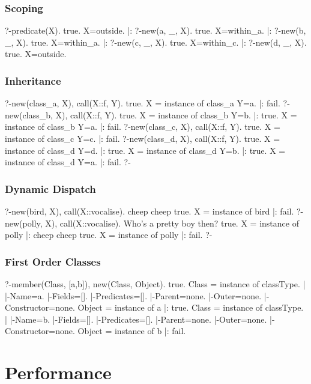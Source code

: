 \documentclass[12pt,a4paper,twoside,openright]{report}
\begin{document}
	\subsubsection{Scoping}
	
?-predicate(X).
true.
X=outside.
|:
?-new(a, _, X).
true.
X=within_a.
|:
?-new(b, _, X).
true.
X=within_a.
|:
?-new(c, _, X).
true.
X=within_c.
|:
?-new(d, _, X).
true.
X=outside.

	\subsubsection{Inheritance}
	
?-new(class_a, X), call(X::f, Y).
true.
X = instance of class_a
Y=a.
|: 
fail.
?-new(class_b, X), call(X::f, Y).
true.
X = instance of class_b
Y=b.
|: 
true.
X = instance of class_b
Y=a.
|: 
fail.
?-new(class_c, X), call(X::f, Y).
true.
X = instance of class_c
Y=c.
|: 
fail.
?-new(class_d, X), call(X::f, Y).
true.
X = instance of class_d
Y=d.
|: 
true.
X = instance of class_d
Y=b.
|: 
true.
X = instance of class_d
Y=a.
|: 
fail.
?-

	\subsubsection {Dynamic Dispatch}

?-new(bird, X), call(X::vocalise).
cheep cheep
true.
X = instance of bird
|: 
fail.
?-new(polly, X), call(X::vocalise).
Who's a pretty boy then?
true.
X = instance of polly
|: 
cheep cheep
true.
X = instance of polly
|: 
fail.
?-

	\subsubsection{First Order Classes}
	
?-member(Class, [a,b]), new(Class, Object).
true.
Class = instance of classType.
        |
        |-Name=a.
        |-Fields=[].
        |-Predicates=[].
        |-Parent=none.
        |-Outer=none.
        |-Constructor=none.
Object = instance of a
|: 
true.
Class = instance of classType.
        |
        |-Name=b.
        |-Fields=[].
        |-Predicates=[].
        |-Parent=none.
        |-Outer=none.
        |-Constructor=none.
Object = instance of b
|: 
fail.

\section{Performance}
\end{document}
